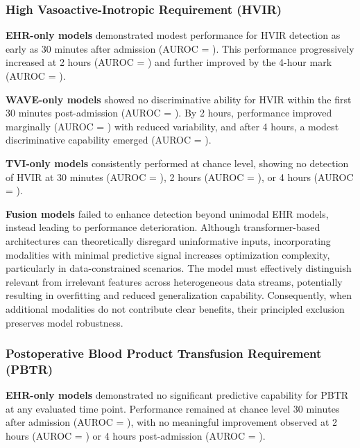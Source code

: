 \subsubsection*{High Vasoactive-Inotropic Requirement (HVIR)}

\vspace{1ex}
\noindent\textbf{EHR-only models} demonstrated modest performance for HVIR detection as early as 30 minutes after admission (AUROC = ). This performance progressively increased at 2 hours (AUROC = ) and further improved by the 4-hour mark (AUROC = ).

\vspace{1ex}
\noindent\textbf{WAVE-only models} showed no discriminative ability for HVIR within the first 30 minutes post-admission (AUROC = ). By 2 hours, performance improved marginally (AUROC = ) with reduced variability, and after 4 hours, a modest discriminative capability emerged (AUROC = ).

\vspace{1ex}
\noindent\textbf{TVI-only models} consistently performed at chance level, showing no detection of HVIR at 30 minutes (AUROC = ), 2 hours (AUROC = ), or 4 hours (AUROC = ).

\vspace{1ex}
\noindent\textbf{Fusion models} failed to enhance detection beyond unimodal EHR models, instead leading to performance deterioration. Although transformer-based architectures can theoretically disregard uninformative inputs, incorporating modalities with minimal predictive signal increases optimization complexity, particularly in data-constrained scenarios. The model must effectively distinguish relevant from irrelevant features across heterogeneous data streams, potentially resulting in overfitting and reduced generalization capability. Consequently, when additional modalities do not contribute clear benefits, their principled exclusion preserves model robustness.

\subsubsection*{Postoperative Blood Product Transfusion Requirement (PBTR)}

\vspace{1ex}
\noindent\textbf{EHR-only models} demonstrated no significant predictive capability for PBTR at any evaluated time point. Performance remained at chance level 30 minutes after admission (AUROC = ), with no meaningful improvement observed at 2 hours (AUROC = ) or 4 hours post-admission (AUROC = ).

